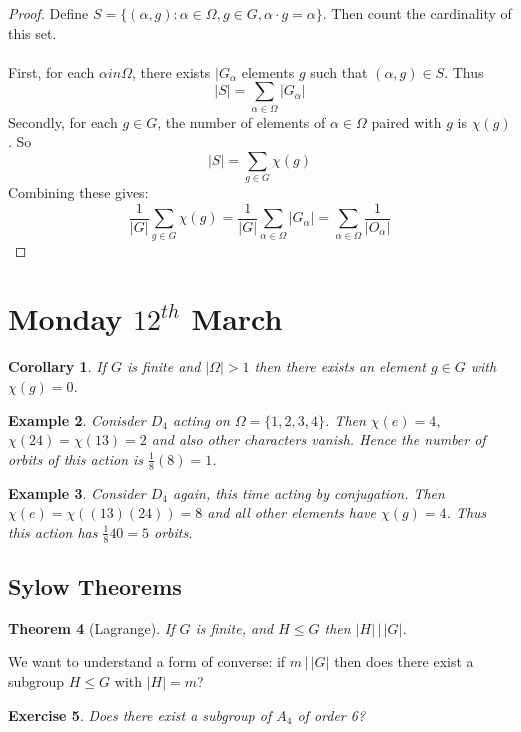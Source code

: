 \documentclass[a4paper,10pt]{article}
\newtheorem{thm}{Theorem}
\newtheorem{Cor}[thm]{Corollary}
\newtheorem{eg}[thm]{Example}
\newtheorem{Ex}[thm]{Exercise}
\begin{document}
\begin{proof}
Define $S = \{ (\alpha, g) : \alpha \in \Omega, g \in G, \alpha \cdot g = \alpha \}$. Then count the cardinality of this set. \\
\\
First, for each $\alpha in \Omega$, there exists $|G_\alpha$ elements $g$ such that $(\alpha, g) \in S$. Thus
\[ |S| = \sum_{\alpha \in \Omega} |G_\alpha| \]
Secondly, for each $g \in G$, the number of elements of $\alpha \in \Omega$ paired with $g$ is $\chi(g)$. So
\[ |S| = \sum_{g \in G} \chi(g) \]
Combining these gives:
\[ \frac{1}{|G|} \sum_{g \in G} \chi(g) = \frac{1}{|G|} \sum_{\alpha \in \Omega} |G_\alpha| = \sum_{\alpha \in \Omega} \frac{1}{|O_\alpha|} \]
\end{proof}

\newpage
\section{Monday $12^{th}$ March}
\begin{Cor}
If $G$ is finite and $|\Omega| >1$ then there exists an element $g \in G$ with $\chi(g) = 0$.  
\end{Cor}

\begin{eg}
Conisder $D_4$ acting on $\Omega = \{ 1,2,3,4 \}$. Then $\chi(e) = 4$, $\chi(24) = \chi(13) = 2$ and also other characters vanish. Hence the number of orbits of this action is $\frac{1}{8} (8) = 1$. 
\end{eg}

\begin{eg}
Consider $D_4$ again, this time acting by conjugation. Then $\chi(e) = \chi((13)(24)) = 8$ and all other elements have $\chi(g) = 4$. Thus this action has $\frac{1}{8} 40 = 5$ orbits. 
\end{eg}

\subsection{Sylow Theorems}
\begin{thm}[Lagrange]
If $G$ is finite, and $H \leq G$ then $|H| \, \big| \, |G|$.
\end{thm}
We want to understand a form of converse: if $m \, \big| \, |G|$ then does there exist a subgroup $H \leq G$ with $|H| = m$?

\begin{Ex}
Does there exist a subgroup of $A_4$ of order 6?
\end{Ex}
\end{document}

